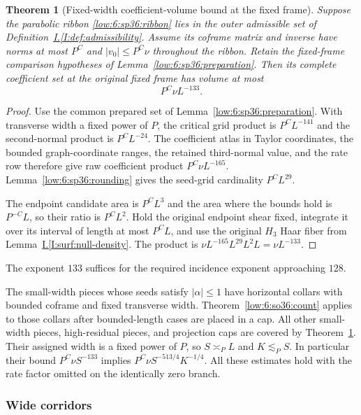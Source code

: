 \documentclass[11pt]{amsart}
\newtheorem{theorem}{Theorem}[section]
\theoremstyle{definition}
\theoremstyle{remark}
\numberwithin{equation}{section}
\newcommand{\partIref}[1]{\hyperref[I:#1]{I.\ref*{I:#1}}}
\begin{document}
\begin{theorem}[Fixed-width coefficient-volume bound at the fixed frame]\label{low:6:sp36:tail}
Suppose the parabolic ribbon \eqref{low:6:sp36:ribbon} lies in the outer admissible set of Definition~\partIref{def:admissibility}. Assume its coframe matrix and inverse have norms at most $P^C$ and $|v_0|\le P^C\nu$ throughout the ribbon. Retain the fixed-frame comparison hypotheses of Lemma~\ref{low:6:sp36:preparation}. Then its complete coefficient set at the original fixed frame has volume at most
\[
P^C\nu L^{-133}.
\]
\end{theorem}
\begin{proof}
Use the common prepared set of Lemma~\ref{low:6:sp36:preparation}. With transverse width a fixed power of $P$, the critical grid product is $P^CL^{-141}$ and the second-normal product is $P^CL^{-24}$. The coefficient atlas in Taylor coordinates, the bounded graph-coordinate ranges, the retained third-normal value, and the rate row therefore give raw coefficient product $P^C\nu L^{-165}$. Lemma~\ref{low:6:sp36:rounding} gives the seed-grid cardinality $P^CL^{29}$.

The endpoint candidate area is $P^CL^3$ and the area where the bounds hold is $P^{-C}L$, so their ratio is $P^CL^2$. Hold the original endpoint shear fixed, integrate it over its interval of length at most $P^CL$, and use the original $H_3$ Haar fiber from Lemma~\partIref{surf:null-density}. The product is $\nu L^{-165}L^{29}L^2L=\nu L^{-133}$. 
\end{proof}

The exponent $133$ suffices for the required incidence exponent approaching $128$.

The small-width pieces whose seeds satisfy $|\alpha|\le1$ have horizontal collars with bounded coframe and fixed transverse width. Theorem~\ref{low:6:so36:count} applies to those collars after bounded-length cases are placed in a cap. All other small-width pieces, high-residual pieces, and projection caps are covered by Theorem~\ref{low:6:sp36:tail}. Their assigned width is a fixed power of $P$, so $S\asymp_PL$ and $K\lesssim_PS$. In particular their bound $P^C\nu S^{-133}$ implies $P^C\nu S^{-513/4}K^{-1/4}$. All these estimates hold with the rate factor omitted on the identically zero branch.

\subsubsection{Wide corridors}
\end{document}
